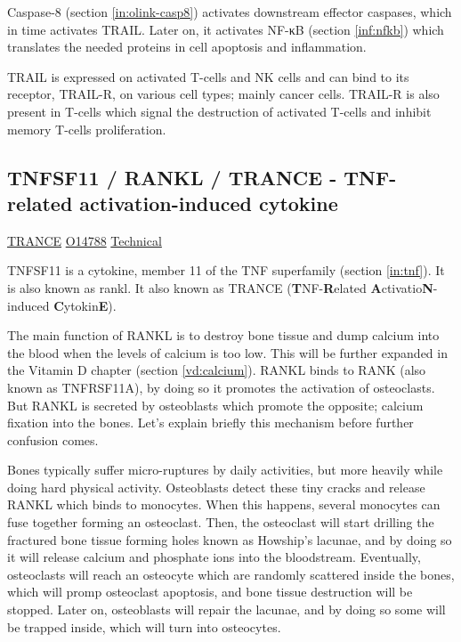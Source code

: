 Caspase-8 (section \ref{in:olink-casp8}) activates downstream effector caspases, which in time activates TRAIL. Later on, it activates NF-κB (section \ref{inf:nfkb}) which translates the needed proteins in cell apoptosis and inflammation.

TRAIL is expressed on activated T-cells and NK cells and can bind to its receptor, TRAIL-R, on various cell types; mainly cancer cells. TRAIL-R is also present in T-cells which signal the destruction of activated T-cells and inhibit memory T-cells proliferation.

\subsection{TNFSF11 / RANKL / TRANCE - TNF-related activation-induced cytokine}
\label{in:RANKL}

\href{https://en.wikipedia.org/wiki/RANKL}{TRANCE}
\href{http://www.uniprot.org/uniprot/O14788}{O14788}
\href{https://olink.com/products-services/target/protein/?assayID=5061}{Technical}

TNFSF11 is a cytokine, member 11 of the TNF superfamily (section \ref{in:tnf}). It is also known as \gls{rankl}. It also known as TRANCE (\textbf{T}NF-\textbf{R}elated \textbf{A}ctivatio\textbf{N}-induced \textbf{C}ytokin\textbf{E}).

The main function of RANKL is to destroy bone tissue and dump calcium into the blood when the levels of calcium is too low. This will be further expanded in the Vitamin D chapter (section \ref{vd:calcium}). RANKL binds to RANK (also known as TNFRSF11A), by doing so it promotes the activation of osteoclasts. But RANKL is secreted by osteoblasts which promote the opposite; calcium fixation into the bones. Let's explain briefly this mechanism before further confusion comes.

Bones typically suffer micro-ruptures by daily activities, but more heavily while doing hard physical activity. Osteoblasts detect these tiny cracks and release RANKL which binds to monocytes. When this happens, several monocytes can fuse together forming an osteoclast. Then, the osteoclast will start drilling the fractured bone tissue forming holes known as Howship's lacunae, and by doing so it will release calcium and phosphate ions into the bloodstream. Eventually, osteoclasts will reach an osteocyte which are randomly scattered inside the bones, which will promp osteoclast apoptosis, and bone tissue destruction will be stopped. Later on, osteoblasts will repair the lacunae, and by doing so some will be trapped inside, which will turn into osteocytes.

